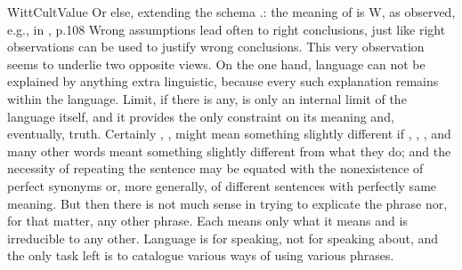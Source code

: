 \citet{The limit of language is shown by its being impossible to describe the
  fact which corresponds to (is the translation of) a sentence, without simply
  repeating the sentence.}{WittCultValue}{ Or else, extending the
  schema .: the meaning of  is W, as
  observed, e.g., in \citeauthor*{DummettM}, p.108} Wrong assumptions lead often to right conclusions, just like
right observations can be used to justify wrong conclusions.  This very
observation seems to underlie two opposite views.  On the one hand, language can
not be explained by anything extra linguistic, because every such explanation
remains within the language. Limit, if there is any, is only an internal limit
of the language itself, and it provides the only constraint on its meaning and,
eventually, truth.  Certainly , , might
mean something slightly different if , , ,
 and many other words meant something slightly different from what
they do; and the necessity of repeating the sentence may be equated with the
nonexistence of perfect synonyms or, more generally, of different sentences with
perfectly same meaning.  But then
there is not much sense in trying to explicate the phrase  nor, for that matter, any other phrase.
Each means only what it means and is irreducible to any other.
Language is for speaking, not for
speaking about, and the only task left is to catalogue various ways of
using various phrases. 

